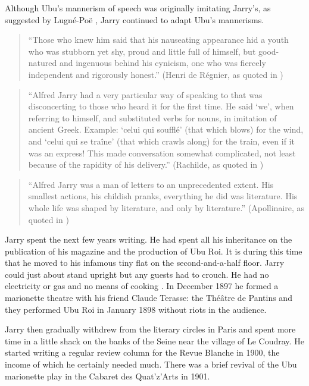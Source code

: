 Although Ubu's mannerism of speech was originally imitating Jarry's, as suggested by Lugné-Poë \autocite[p.155]{Brotchie2011}, Jarry continued to adapt Ubu's mannerisms.

\begin{quote}
  ``Those who knew him said that his nauseating appearance hid a youth who was stubborn yet shy, proud and little full of himself, but good-natured and ingenuous behind his cynicism, one who was fiercely independent and rigorously honest.'' (Henri de Régnier, as quoted in \autocite[p.181]{Brotchie2011})
\end{quote}

\begin{quote}
  ``Alfred Jarry had a very particular way of speaking to that was disconcerting to those who heard it for the first time. He said `we', when referring to himself, and substituted verbs for nouns, in imitation of ancient Greek. Example: `celui qui soufflé' (that which blows) for the wind, and `celui qui se traîne' (that which crawls along) for the train, even if it was an express! This made conversation somewhat complicated, not least because of the rapidity of his delivery.'' (Rachilde, as quoted in \autocite[p.181]{Brotchie2011})
\end{quote}

\begin{quote}
  ``Alfred Jarry was a man of letters to an unprecedented extent. His smallest actions, his childish pranks, everything he did was literature. His whole life was shaped by literature, and only by literature.'' (Apollinaire, as quoted in \autocite[p.307]{Brotchie2011})
\end{quote}

Jarry spent the next few years writing. He had spent all his inheritance on the publication of his magazine and the production of Ubu Roi. It is during this time that he moved to his infamous tiny flat on the second-and-a-half floor. Jarry could just about stand upright but any guests had to crouch. He had no electricity or gas and no means of cooking \autocite[p.195]{Brotchie2011}. In December 1897 he formed a marionette theatre with his friend Claude Terasse: the Théâtre de Pantins and they performed Ubu Roi in January 1898 without riots in the audience.

Jarry then gradually withdrew from the literary circles in Paris and spent more time in a little shack on the banks of the Seine near the village of Le Coudray. He started writing a regular review column for the Revue Blanche in 1900, the income of which he certainly needed much. There was a brief revival of the Ubu marionette play in the Cabaret des Quat'z'Arts in 1901.

